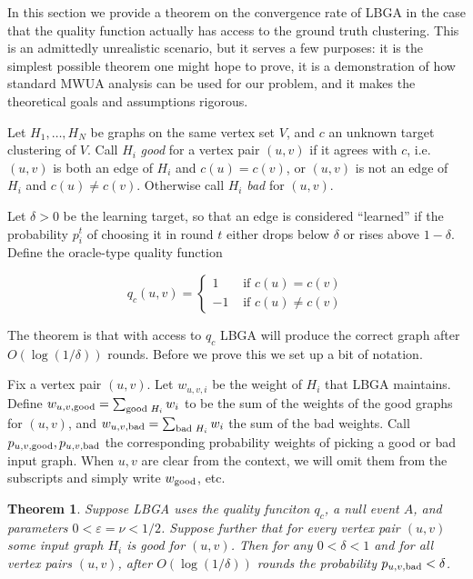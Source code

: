 \documentclass{article}
\newtheorem{thm}{Theorem}
\begin{document}
In this section we provide a theorem on the convergence rate of LBGA in the
case that the quality function actually has access to the ground truth
clustering. This is an admittedly unrealistic scenario, but it serves a few
purposes: it is the simplest possible theorem one might hope to prove, it is a
demonstration of how standard MWUA analysis can be used for our problem, and it
makes the theoretical goals and assumptions rigorous.

Let $H_1, \dots, H_N$ be graphs on the same vertex set $V$, and $c$ an unknown
target clustering of $V$. Call $H_i$ \emph{good} for a vertex pair $(u,v)$ if
it agrees with $c$, i.e. $(u,v)$ is both an edge of $H_i$ and $c(u) = c(v)$, or
$(u,v)$ is not an edge of $H_i$ and $c(u)\neq c(v)$. Otherwise call $H_i$
\emph{bad} for $(u,v)$. 

Let $\delta > 0$ be the learning target, so that an edge is considered
``learned'' if the probability $p_i^t$ of choosing it in round $t$ either drops
below $\delta$ or rises above $1 - \delta$. Define the oracle-type quality
function

$$
   q_c(u,v) = 
      \begin{cases}
          1 & \mbox{ if } c(u) = c(v) \\ 
         -1 & \mbox{ if } c(u) \neq c(v) 
      \end{cases}
$$

The theorem is that with access to $q_c$ LBGA will produce the correct graph
after $O(\log(1/\delta))$ rounds. Before we prove this we set up a bit of
notation.

Fix a vertex pair $(u,v)$. Let $w_{u,v,i}$ be the weight of $H_i$ that LBGA
maintains. Define $w_{u,v,\textup{good}} = \sum_{\textup{good } H_i} w_i$ to be
the sum of the weights of the good graphs for $(u,v)$, and
$w_{u,v,\textup{bad}} = \sum_{\textup{bad } H_i} w_i$ the sum of the bad
weights. Call $p_{u,v,\textup{good}}, p_{u,v,\textup{bad}}$ the corresponding
probability weights of picking a good or bad input graph. When $u,v$ are clear
from the context, we will omit them from the subscripts and simply write
$w_{\textup{good}}$, etc. 

\begin{thm}
Suppose LBGA uses the quality funciton $q_c$, a null event $A$, and parameters
$0 < \varepsilon = \nu < 1/2$. Suppose further that for every vertex pair
$(u,v)$ some input graph $H_i$ is good for $(u,v)$. Then for any $0 < \delta <
1$ and for all vertex pairs $(u,v)$, after $O(\log(1 / \delta))$ rounds the
probability $p_{u,v,\textup{bad}} < \delta$.  
\end{thm}
\end{document}
